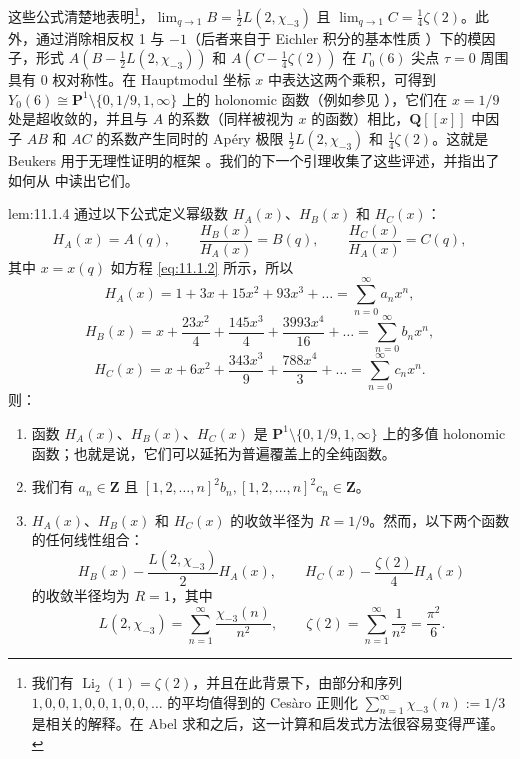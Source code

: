 这些公式清楚地表明\setcounter{footnote}{37}\footnote{我们有 $\operatorname{Li}_2(1) = \zeta(2)$，并且在此背景下，由部分和序列 $1, 0, 0, 1, 0, 0, 1, 0, 0, \dots$ 的平均值得到的 Ces\`aro 正则化 $\sum_{n=1}^{\infty} \chi_{-3}(n) := 1/3$ 是相关的解释。在 Abel 求和之后，这一计算和启发式方法很容易变得严谨。}，$\lim_{q\to 1} B = \frac{1}{2}L(2,\chi_{-3})$ 且 $\lim_{q\to 1} C = \frac{1}{4}\zeta(2)$。此外，通过消除相反权 1 与 $-1$（后者来自于 Eichler 积分的基本性质 \cite{Wei77}）下的模因子，形式 $A(B - \frac{1}{2}L(2,\chi_{-3}))$ 和 $A(C - \frac{1}{4}\zeta(2))$ 在 $\Gamma_0(6)$ 尖点 $\tau=0$ 周围具有 0 权对称性。在 Hauptmodul 坐标 $x$ 中表达这两个乘积，可得到 $Y_0(6) \cong \mathbf{P}^1 \setminus \{0,1/9,1,\infty\}$ 上的 holonomic 函数（例如参见 \cite[第 2.3 节]{KZ01}），它们在 $x=1/9$ 处是超收敛的，并且与 $A$ 的系数（同样被视为 $x$ 的函数）相比，$\mathbf{Q}[\![x]\!]$ 中因子 $AB$ 和 $AC$ 的系数产生同时的 Ap{\'e}ry 极限 $\frac{1}{2}L(2,\chi_{-3})$ 和 $\frac{1}{4}\zeta(2)$。这就是 Beukers 用于无理性证明的框架 \cite{Beu87}。我们的下一个引理收集了这些评述，并指出了如何从 \cite{Zag09} 中读出它们。

\begin{mylemma}{}{lem:11.1.4}
通过以下公式定义幂级数 $H_A(x)$、$H_B(x)$ 和 $H_C(x)$：
\[ H_A(x) = A(q), \qquad \frac{H_B(x)}{H_A(x)} = B(q), \qquad \frac{H_C(x)}{H_A(x)} = C(q), \]
其中 $x = x(q)$ 如方程 \eqref{eq:11.1.2} 所示，所以
\[ H_A(x) = 1 + 3x + 15x^2 + 93x^3 + \dots = \sum_{n=0}^{\infty} a_n x^n, \]
\[ H_B(x) = x + \frac{23x^2}{4} + \frac{145x^3}{4} + \frac{3993x^4}{16} + \dots = \sum_{n=0}^{\infty} b_n x^n, \]
\[ H_C(x) = x + 6x^2 + \frac{343x^3}{9} + \frac{788x^4}{3} + \dots = \sum_{n=0}^{\infty} c_n x^n. \]
则：
\begin{enumerate}
\item[(1)] 函数 $H_A(x)$、$H_B(x)$、$H_C(x)$ 是 $\mathbf{P}^1 \setminus \{0, 1/9, 1, \infty\}$ 上的多值 holonomic 函数；也就是说，它们可以延拓为普遍覆盖上的全纯函数。
\item[(2)] 我们有 $a_n \in \mathbf{Z}$ 且 $[1, 2, \dots, n]^2 b_n, [1, 2, \dots, n]^2 c_n \in \mathbf{Z}$。
\item[(3)] $H_A(x)$、$H_B(x)$ 和 $H_C(x)$ 的收敛半径为 $R = 1/9$。然而，以下两个函数的任何线性组合：
\[ H_B(x) - \frac{L(2,\chi_{-3})}{2}H_A(x), \qquad H_C(x) - \frac{\zeta(2)}{4}H_A(x) \]
的收敛半径均为 $R = 1$，其中
\[ L(2,\chi_{-3}) = \sum_{n=1}^{\infty} \frac{\chi_{-3}(n)}{n^2}, \qquad \zeta(2) = \sum_{n=1}^{\infty} \frac{1}{n^2} = \frac{\pi^2}{6}. \]
\end{enumerate}
\end{mylemma}

